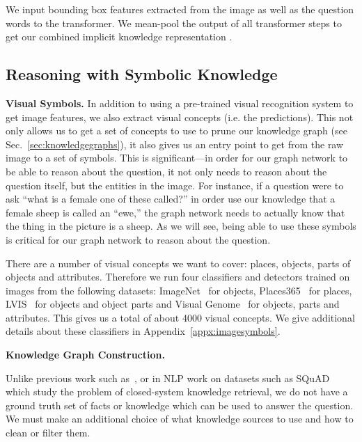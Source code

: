 \documentclass[final]{cvpr}
\providecommand{\myparagraph}[1]{\noindent\textbf{#1.}}
\providecommand{\sectionvspace}{\vspace{-0cm}}
\begin{document}
We input bounding box features extracted from the image as well as the question words to the transformer. We mean-pool the output of all transformer steps to get our combined implicit knowledge representation . 

\sectionvspace
\subsection{Reasoning with Symbolic Knowledge}
\label{sec:model:symbol}
\sectionvspace


\myparagraph{Visual Symbols}
In addition to using a pre-trained visual recognition system to get image features,
we also extract visual concepts (i.e. the predictions). This not only allows us to get a set of concepts to use to prune our knowledge graph (see Sec.~\ref{sec:knowledgegraphs}), it also gives us an entry point to get from the raw image to a set of symbols. This is significant---in order for our graph network to be able to reason about the question, it not only needs to reason about the question itself, but the entities in the image. For instance, if a question were to ask ``what is a female one of these called?'' in order use our knowledge that a female sheep is called an ``ewe,'' the graph network needs to actually know that the thing in the picture is a sheep. As we will see, being able to use these symbols is critical for our graph network to reason about the question.

There are a number of visual concepts we want to cover: places, objects, parts of objects and attributes. Therefore we run four classifiers and detectors trained on images from the following datasets: ImageNet~\cite{ILSVRC15} for objects, Places365~\cite{zhou2017places} for places, LVIS~\cite{gupta2019lvis} for objects and object parts and Visual Genome~\cite{krishnavisualgenome} for objects, parts and attributes. This gives us a total of about 4000 visual concepts. We give additional details about these classifiers in Appendix~\ref{appx:imagesymbols}. 


\myparagraph{Knowledge Graph Construction}
\label{sec:knowledgegraphs}

Unlike previous work such as~\cite{narasimhan2018out}, or in NLP work on datasets such as SQuAD  \cite{rajpurkar16squad} which study the problem of closed-system knowledge retrieval, we do not have a ground truth set of facts or knowledge which can be used to answer the question. We must make an additional choice of what knowledge sources to use and how to clean or filter them.
\end{document}

